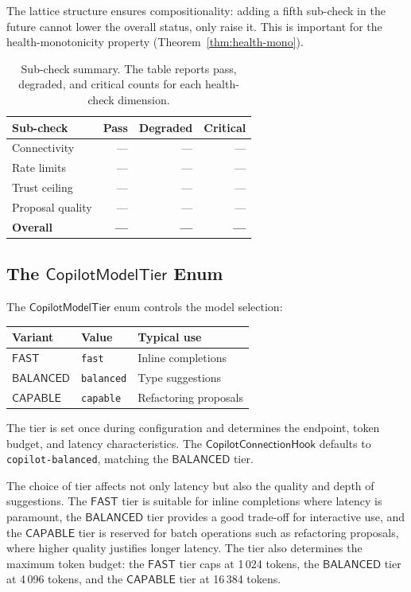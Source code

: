 \documentclass[11pt]{article}
\newcommand{\CCH}{\mathsf{CopilotConnectionHook}}
\newcommand{\CMT}{\mathsf{CopilotModelTier}}
\newcommand{\FAST}{\mathsf{FAST}}
\newcommand{\BALANCED}{\mathsf{BALANCED}}
\newcommand{\CAPABLE}{\mathsf{CAPABLE}}
\begin{document}
The lattice structure ensures compositionality: adding a fifth
sub-check in the future cannot lower the overall status, only
raise it.  This is important for the health-monotonicity property
(Theorem~\ref{thm:health-mono}).

\begin{table}[t]
\centering
\caption{Sub-check summary.  The table reports pass, degraded, and critical
  counts for each health-check dimension.}
\label{tab:health-summary}
\begin{tabular}{@{}lrrr@{}}
\toprule
Sub-check & Pass & Degraded & Critical \\
\midrule
Connectivity        & --- & --- & --- \\
Rate limits         & --- & --- & --- \\
Trust ceiling       & --- & --- & --- \\
Proposal quality    & --- & --- & --- \\
\midrule
\textbf{Overall}    & \textbf{---} & \textbf{---} & \textbf{---} \\
\bottomrule
\end{tabular}
\end{table}

\subsection{The \texorpdfstring{$\CMT$}{CopilotModelTier} Enum}

The $\CMT$ enum controls the model selection:

\begin{center}
\begin{tabular}{@{}lll@{}}
\toprule
Variant & Value & Typical use \\
\midrule
$\FAST$      & \texttt{fast}     & Inline completions \\
$\BALANCED$  & \texttt{balanced} & Type suggestions \\
$\CAPABLE$   & \texttt{capable}  & Refactoring proposals \\
\bottomrule
\end{tabular}
\end{center}

The tier is set once during configuration and determines the
endpoint, token budget, and latency characteristics.  The
$\CCH$ defaults to \texttt{copilot-balanced},
matching the $\BALANCED$ tier.

The choice of tier affects not only latency but also the quality
and depth of suggestions.  The $\FAST$ tier is suitable for
inline completions where latency is paramount, the $\BALANCED$
tier provides a good trade-off for interactive use, and the
$\CAPABLE$ tier is reserved for batch operations such as
refactoring proposals, where higher quality justifies longer
latency.  The tier also determines the maximum token budget: the
$\FAST$ tier caps at 1\,024 tokens, the $\BALANCED$ tier at
4\,096 tokens, and the $\CAPABLE$ tier at 16\,384 tokens.
\end{document}
